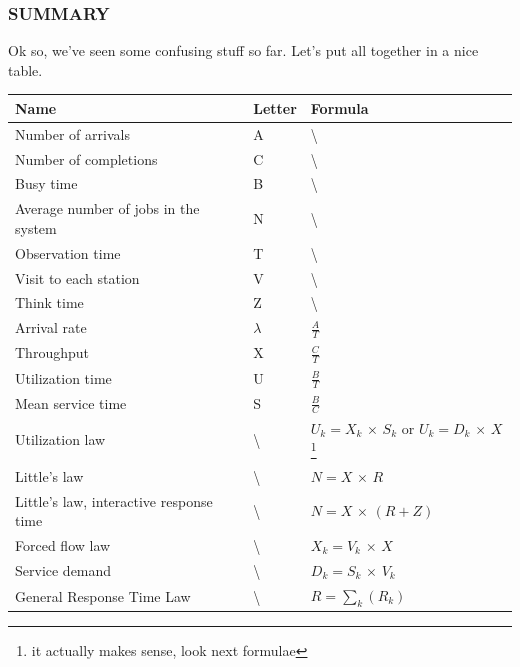 \documentclass{article}
\begin{document}
				\subsubsection{SUMMARY}
					Ok so, we've seen some confusing stuff so far. Let's put all together in a nice table.
					\begin{center}
						\begin{longtable}{ | m{} || m{0.2\textwidth} | m{} | }
							\hline
							Name & Letter & Formula \\
							\hline
							\hline
							Number of arrivals & A & \textbackslash \\
							\hline
							Number of completions & C & \textbackslash \\
							\hline
							Busy time & B & \textbackslash \\
							\hline
							Average number of jobs in the system & N & \textbackslash \\
							\hline
							Observation time & T & \textbackslash \\
							\hline
							Visit to each station & V & \textbackslash \\
							\hline
							Think time & Z & \textbackslash \\
							\hline
							Arrival rate & $\lambda$ & $\frac{A}{T}$ \\
							\hline
							Throughput & X & $\frac{C}{T}$ \\
							\hline
							Utilization time & U & $\frac{B}{T}$ \\
							\hline
							Mean service time & S & $\frac{B}{C}$ \\
							\hline
							Utilization law & \textbackslash & $ U_k = X_k \,\times\, S_k$ or $U_k = D_k \,\times\, X$\footnote{it actually makes sense, look next formulae} \\
							\hline
							Little's law & \textbackslash & $ N = X \,\times\, R $ \\
							\hline
							Little's law, interactive response time & \textbackslash & $ N = X \,\times\,(R+Z) $ \\
							\hline
							Forced flow law & \textbackslash & $ X_k = V_k \,\times\, X $ \\
							\hline
							Service demand & \textbackslash & $ D_k = S_k \,\times\, V_k $ \\
							\hline
							General Response Time Law & \textbackslash & $ R = \sum_k(R_k) $ \\
							\hline
						\end{longtable}
					\end{center}
\end{document}
